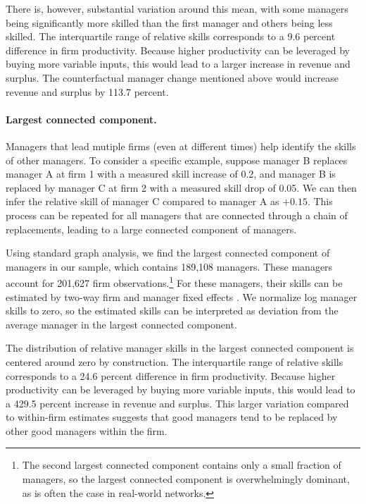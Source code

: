 \documentclass[11pt,a4paper]{article}
\begin{document}
There is, however, substantial variation around this mean, with some managers being significantly more skilled than the first manager and others being less skilled. The interquartile range of relative skills corresponds to a 9.6 percent difference in firm productivity. Because higher productivity can be leveraged by buying more variable inputs, this would lead to a larger increase in revenue and surplus. The counterfactual manager change mentioned above would increase revenue and surplus by 113.7 percent.


\paragraph{Largest connected component.}
Managers that lead mutiple firms (even at different times) help identify the skills of other managers. To consider a specific example, suppose manager B replaces manager A at firm 1 with a measured skill increase of 0.2, and manager B is replaced by manager C at firm 2 with a measured skill drop of 0.05. We can then infer the relative skill of manager C compared to manager A as $+0.15$. This process can be repeated for all managers that are connected through a chain of replacements, leading to a large connected component of managers.

Using standard graph analysis, we find the largest connected component of managers in our sample, which contains 189,108 managers. These managers account for 201,627 firm observations.\footnote{The second largest connected component contains only a small fraction of managers, so the largest connected component is overwhelmingly dominant, as is often the case in real-world networks.} For these managers, their skills can be estimated by two-way firm and manager fixed effects \citep{Abowd1999Econometrica,reghdfe}. We normalize log manager skills to zero, so the estimated skills can be interpreted as deviation from the average manager in the largest connected component. 

The distribution of relative manager skills in the largest connected component is centered around zero by construction. The interquartile range of relative skills corresponds to a 24.6 percent difference in firm productivity. Because higher productivity can be leveraged by buying more variable inputs, this would lead to a 429.5 percent increase in revenue and surplus. This larger variation compared to within-firm estimates suggests that good managers tend to be replaced by other good managers within the firm. 
\end{document}
